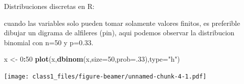 \documentclass[ignorenonframetext,]{beamer}
\newenvironment{Shaded}{\begin{snugshade}}{\end{snugshade}}
\newcommand{\KeywordTok}[1]{\textcolor[rgb]{0.13,0.29,0.53}{\textbf{#1}}}
\newcommand{\DataTypeTok}[1]{\textcolor[rgb]{0.13,0.29,0.53}{#1}}
\newcommand{\DecValTok}[1]{\textcolor[rgb]{0.00,0.00,0.81}{#1}}
\newcommand{\StringTok}[1]{\textcolor[rgb]{0.31,0.60,0.02}{#1}}
\newcommand{\OperatorTok}[1]{\textcolor[rgb]{0.81,0.36,0.00}{\textbf{#1}}}
\newcommand{\NormalTok}[1]{#1}
\begin{document}
\begin{frame}[fragile]{Distribuciones discretas en R:}

cuando las variables solo pueden tomar solamente valores finitos, es
preferible dibujar un digrama de alfileres (pin), aqui podemos observar
la distribucion binomial con n=50 y p=0.33.

\begin{Shaded}
\begin{Highlighting}[]
\NormalTok{x <-}\StringTok{ }\DecValTok{0}\OperatorTok{:}\DecValTok{50}
\KeywordTok{plot}\NormalTok{(x,}\KeywordTok{dbinom}\NormalTok{(x,}\DataTypeTok{size=}\DecValTok{50}\NormalTok{,}\DataTypeTok{prob=}\NormalTok{.}\DecValTok{33}\NormalTok{),}\DataTypeTok{type=}\StringTok{"h"}\NormalTok{)}
\end{Highlighting}
\end{Shaded}

\texttt{[image: class1\_files/figure-beamer/unnamed-chunk-4-1.pdf]}

\end{frame}
\end{document}
